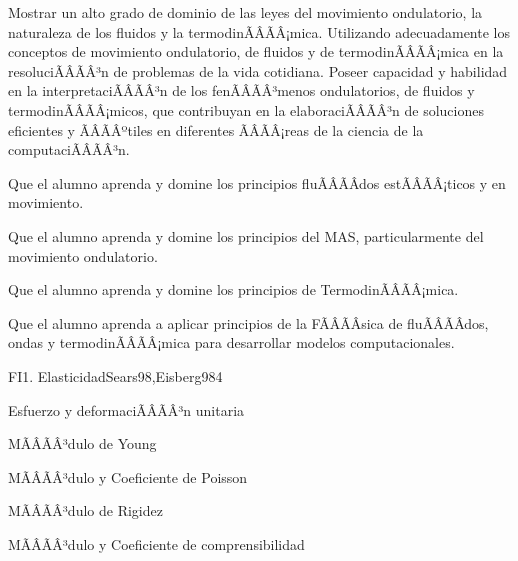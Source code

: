 \begin{sumilla}


\begin{fundamentacion}
Mostrar un alto grado de dominio de las leyes del movimiento ondulatorio, la naturaleza de los fluidos y la termodinÃÂÃÂ¡mica. Utilizando adecuadamente los conceptos de movimiento ondulatorio, de fluidos y de termodinÃÂÃÂ¡mica en la resoluciÃÂÃÂ³n de problemas de la vida cotidiana. Poseer capacidad y habilidad en la interpretaciÃÂÃÂ³n de los fenÃÂÃÂ³menos ondulatorios, de fluidos y termodinÃÂÃÂ¡micos, que contribuyan en la elaboraciÃÂÃÂ³n de soluciones eficientes y ÃÂÃÂºtiles en diferentes ÃÂÃÂ¡reas de la ciencia de la computaciÃÂÃÂ³n.
\end{fundamentacion}

\begin{objetivosdelcurso}
\item  Que el alumno aprenda y domine los principios fluÃÂÃÂ­dos estÃÂÃÂ¡ticos y en movimiento.
\item  Que el alumno aprenda y domine los principios del MAS, particularmente del movimiento ondulatorio.
\item  Que el alumno aprenda y domine los principios de TermodinÃÂÃÂ¡mica.
\item  Que el alumno aprenda a aplicar principios de la FÃÂÃÂ­sica de fluÃÂÃÂ­dos, ondas y termodinÃÂÃÂ¡mica para desarrollar modelos computacionales.
\end{objetivosdelcurso}

\begin{outcomes}
\end{outcomes}

\begin{unit}{FI1. Elasticidad}{Sears98,Eisberg98}{4}
\begin{topicos}
         \item  Esfuerzo y deformaciÃÂÃÂ³n unitaria
	 \item  MÃÂÃÂ³dulo de Young
         \item  MÃÂÃÂ³dulo y Coeficiente de Poisson
	 \item  MÃÂÃÂ³dulo de Rigidez
         \item  MÃÂÃÂ³dulo y Coeficiente de comprensibilidad
   \end{topicos}


\end{unit}
\end{sumilla}
